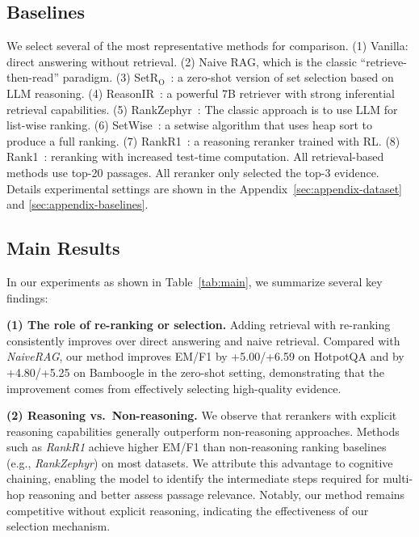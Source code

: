 \documentclass[11pt]{article}
\begin{document}
\subsection{Baselines}
We select several of the most representative methods for comparison. 
(1) Vanilla: direct answering without retrieval.
(2) Naive RAG, which is the classic “retrieve-then-read” paradigm.
(3) SetR$_\text{O}$~\citep{lee2025shifting}: a zero-shot version of set selection based on LLM reasoning.
(4) ReasonIR~\citep{shao2025reasonir}: a powerful 7B retriever with strong inferential retrieval capabilities. 
(5) RankZephyr~\citep{pradeep2023rankzephyr}: The classic approach is to use LLM for list-wise ranking.
(6) SetWise~\citep{zhuang2024setwise}: a setwise algorithm that uses heap sort to produce a full ranking.
(7) RankR1~\citep{zhuang2025rank}: a reasoning reranker trained with RL.
(8) Rank1~\citep{weller2025rank1}: reranking with increased test-time computation.
All retrieval-based methods use top-20 passages. 
All reranker only selected the top-3 evidence.
Details experimental settings are shown in the Appendix~\ref{sec:appendix-dataset} and \ref{sec:appendix-baselines}. 

\subsection{Main Results}
In our experiments as shown in Table~\ref{tab:main},  we summarize several key findings:

\textbf{(1) The role of re-ranking or selection.}
Adding retrieval with re-ranking consistently improves over direct answering and naive retrieval.
Compared with \textit{NaiveRAG}, our method improves EM/F1 by +5.00/+6.59 on HotpotQA and by +4.80/+5.25 on Bamboogle in the zero-shot setting, demonstrating that the improvement comes from effectively selecting high-quality evidence.

\textbf{(2) Reasoning vs.\ Non-reasoning.}
We observe that rerankers with explicit reasoning capabilities generally outperform non-reasoning approaches. 
Methods such as \textit{RankR1} achieve higher EM/F1 than non-reasoning ranking baselines (e.g., \textit{RankZephyr}) on most datasets. 
We attribute this advantage to cognitive chaining, enabling the model to identify the intermediate steps required for multi-hop reasoning and better assess passage relevance.
Notably, our method remains competitive without explicit reasoning, indicating the effectiveness of our selection mechanism.
\end{document}
